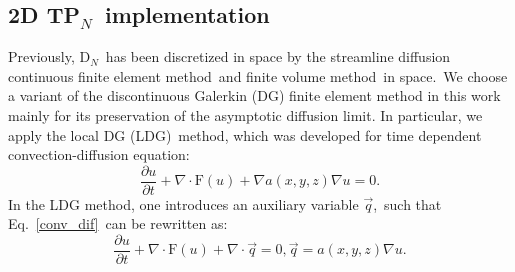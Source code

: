 \documentclass[review]{elsarticle}
\newcommand{\pn}{P$_N$}
\newcommand{\dn}{D$_N$}
\begin{document}
\subsection{2D T\pn\ implementation}
{
Previously, \dn\ has been discretized in space by the streamline diffusion continuous finite element method\cite{levermoredn}\ and finite volume method\cite{p3qs,cory_hauck_closures}\ in space.\ We choose a variant of the discontinuous Galerkin (DG) finite element method  in this work mainly for its preservation of the asymptotic diffusion limit. In particular, we apply the local DG (LDG)\ method, which was developed for time dependent convection-diffusion equation\cite{cockburn_ldg}:\
\begin{equation}\label{conv_dif}
\frac{\partial u}{\partial t}+\nabla\cdot\mathrm{F}(u)+\nabla a(x,y,z)\nabla u=0.
\end{equation}
In the LDG method, one introduces an auxiliary variable $\vec{q}$,\ such that Eq.\ \eqref{conv_dif}\ can be rewritten as:
\begin{subequations}\label{ldg}
\begin{equation}\label{ldg1}
\frac{\partial u}{\partial t}+\nabla\cdot\mathrm{F}(u)+\nabla\cdot\vec{q}=0,
\end{equation}
\begin{equation}
\vec{q}=a(x,y,z)\nabla u.
\end{equation}
\end{subequations}
	}

{
	}
%
\end{document}

